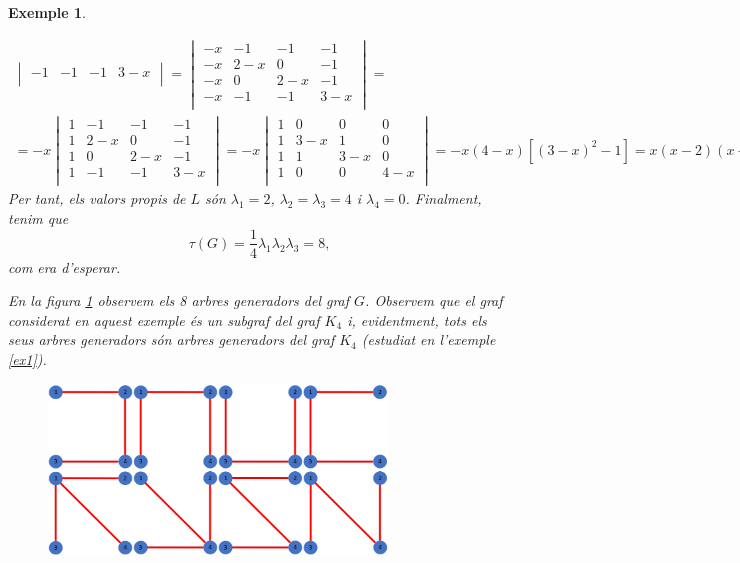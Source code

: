 \documentclass{article}
\newtheorem{example}{Exemple}[section]
\begin{document}
\begin{example}
\begin{enumerate}
\begin{multline*}
\begin{vmatrix}
                      -1  & -1  & -1  & 3-x \\
                  \end{vmatrix}=\begin{vmatrix}
                      -x & -1  & -1  & -1  \\
                      -x & 2-x & 0   & -1  \\
                      -x & 0   & 2-x & -1  \\
                      -x & -1  & -1  & 3-x \\
                  \end{vmatrix}=\\=-x\begin{vmatrix}
                      1 & -1  & -1  & -1  \\
                      1 & 2-x & 0   & -1  \\
                      1 & 0   & 2-x & -1  \\
                      1 & -1  & -1  & 3-x \\
                  \end{vmatrix}=-x\begin{vmatrix}
                      1 & 0   & 0   & 0   \\
                      1 & 3-x & 1   & 0   \\
                      1 & 1   & 3-x & 0   \\
                      1 & 0   & 0   & 4-x \\
                  \end{vmatrix}=-x(4-x)[(3-x)^2-1]=x(x-2)(x-4)^2.
              \end{multline*}
              Per tant, els valors propis de $L$ són $\lambda_1=2$, $\lambda_2=\lambda_3=4$ i $\lambda_4=0$. Finalment, tenim que $$\tau(G)=\frac{1}{4}\lambda_1\lambda_2\lambda_3=8,$$ com era d'esperar.
    \end{enumerate}
    En la figura \ref{graf1_8} observem els 8 arbres generadors del graf $G$. Observem que el graf considerat en aquest exemple és un subgraf del graf $K_4$ i, evidentment, tots els seus arbres generadors són arbres generadors del graf $K_4$ (estudiat en l'exemple \ref{ex1}).
    \begin{figure}[H]
        \centering
        \includegraphics[width=9cm]{Imatges/graf1_8.jpg}
        \label{graf1_8}
    \end{figure}
\end{example}
\end{document}
